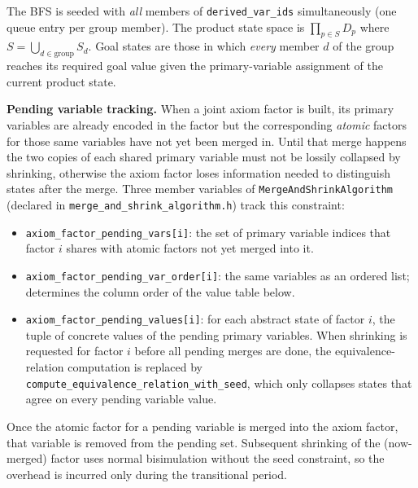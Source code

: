 \documentclass[11pt,a4paper]{article}
\begin{document}
    The BFS is seeded with \emph{all} members of \texttt{derived\_var\_ids}
    simultaneously (one queue entry per group member).  The product state
    space is $\prod_{p \in S} D_p$ where $S = \bigcup_{d \in \text{group}}
    S_d$.  Goal states are those in which \emph{every} member $d$ of the
    group reaches its required goal value given the primary-variable
    assignment of the current product state.

    \textbf{Pending variable tracking.}
    When a joint axiom factor is built, its primary variables are already
    encoded in the factor but the corresponding \emph{atomic} factors for
    those same variables have not yet been merged in.  Until that merge
    happens the two copies of each shared primary variable must not be
    lossily collapsed by shrinking, otherwise the axiom factor loses
    information needed to distinguish states after the merge.  Three member
    variables of \texttt{MergeAndShrinkAlgorithm} (declared in
    \texttt{merge\_and\_shrink\_algorithm.h}) track this constraint:

    \begin{itemize}
      \item \texttt{axiom\_factor\_pending\_vars[i]}: the set of primary
        variable indices that factor $i$ shares with atomic factors not yet
        merged into it.
      \item \texttt{axiom\_factor\_pending\_var\_order[i]}: the same
        variables as an ordered list; determines the column order of the
        value table below.
      \item \texttt{axiom\_factor\_pending\_values[i]}: for each abstract
        state of factor $i$, the tuple of concrete values of the pending
        primary variables.  When shrinking is requested for factor $i$
        before all pending merges are done, the equivalence-relation
        computation is replaced by
        \texttt{compute\_equivalence\_relation\_with\_seed}, which only
        collapses states that agree on every pending variable value.
    \end{itemize}

    Once the atomic factor for a pending variable is merged into the axiom
    factor, that variable is removed from the pending set.  Subsequent
    shrinking of the (now-merged) factor uses normal bisimulation without
    the seed constraint, so the overhead is incurred only during the
    transitional period.

\end{document}
